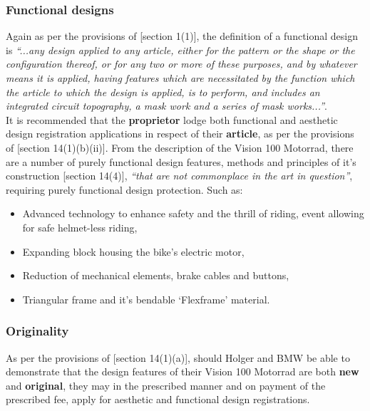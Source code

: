 \documentclass[11pt]{article}
\begin{document}
\subsubsection{Functional designs}
\label{sec:org87847c9}

Again as per the provisions of [section 1(1)]\cite{rsa93_designs_act}, the
definition of a functional design is \textit{``...any design applied to any article,
either for the pattern or the shape or the configuration thereof, or for any two
or more of these purposes, and by whatever means it is applied, having features
which are necessitated by the function which the article to which the design is
applied, is to perform, and includes an integrated circuit topography, a mask
work and a series of mask works...''}.\\

It is recommended that the \textbf{proprietor} lodge both functional and aesthetic
design registration applications in respect of their \textbf{article}, as per the
provisions of [section 14(1)(b)(ii)]\cite{rsa93_designs_act}. From the description
of the Vision 100 Motorrad, there are a number of purely functional design features, methods and
principles of it's construction [section 14(4)]\cite{rsa93_designs_act}, \emph{``that
are not commonplace in the art in question''}, requiring purely functional
design protection. Such as:
\begin{itemize}
\item Advanced technology to enhance safety and the thrill of riding, event allowing
for safe helmet-less riding,
\item Expanding block housing the bike's electric motor,
\item Reduction of mechanical elements, brake cables and buttons,
\item Triangular frame and it's bendable `Flexframe' material.
\end{itemize}

\subsubsection{Originality}
\label{sec:orgca78f25}

As per the provisions of [section 14(1)(a)]\cite{rsa93_designs_act}, should Holger
and BMW be able to demonstrate that the design features of their Vision 100
Motorrad are both \textbf{new} and \textbf{original}, they may in the prescribed manner and on
payment of the prescribed fee, apply for aesthetic and functional design
registrations.\\
\end{document}

